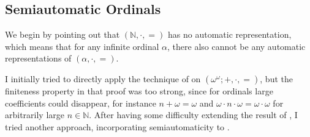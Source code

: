 \documentclass[british,a4paper,]{scrartcl}
\theoremstyle{definition}
\theoremstyle{remark}
\newcommand{\N}{\mathbb{N}}
\begin{document}
\subsection{Semiautomatic Ordinals}

We begin by pointing out that \((\N,\cdot,=)\) has no automatic representation, which means that for any infinite ordinal \(\alpha\), there also cannot be any automatic representations of \((\alpha, \cdot, =)\).

I initially tried to directly apply the technique of  on \((\omega^\omega; +, \cdot, =)\),
but the finiteness property in that proof was too strong, since for ordinals large coefficients could disappear, for instance
\(n + \omega = \omega\) and \(\omega\cdot n\cdot\omega = \omega\cdot\omega\) for arbitrarily large \(n\in\N\).
After having some difficulty extending the result of ,
I tried another approach, incorporating semiautomaticity to .
\end{document}
